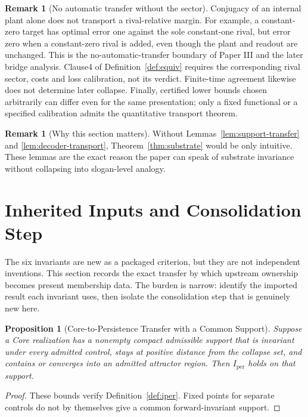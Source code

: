 \documentclass[11pt,a4paper]{article}
\newtheorem{proposition}[theorem]{Proposition}
\theoremstyle{definition}
\newtheorem{remark}[theorem]{Remark}
\newcommand{\Iper}{I_{\mathrm{per}}}
\begin{document}
\begin{remark}[No automatic transfer without the sector]\label{rem:sector-nontransfer}
Conjugacy of an internal plant alone does not transport a rival-relative margin. For example, a constant-zero target has optimal error one against the sole constant-one rival, but error zero when a constant-zero rival is added, even though the plant and readout are unchanged. This is the no-automatic-transfer boundary of Paper III and the later bridge analysis. Clause4 of Definition~\ref{def:equiv} requires the corresponding rival sector, costs and loss calibration, not its verdict. Finite-time agreement likewise does not determine later collapse. Finally, certified lower bounds chosen arbitrarily can differ even for the same presentation; only a fixed functional or a specified calibration admits the quantitative transport theorem.
\end{remark}

\begin{remark}[Why this section matters]
Without Lemmas~\ref{lem:support-transfer} and \ref{lem:decoder-transport}, Theorem~\ref{thm:substrate} would be only intuitive. These lemmas are the exact reason the paper can speak of substrate invariance without collapsing into slogan-level analogy.
\end{remark}

\section{Inherited Inputs and Consolidation Step}
The six invariants are new as a packaged criterion, but they are not independent inventions. This section records the exact transfer by which upstream ownership becomes present membership data. The burden is narrow: identify the imported result each invariant uses, then isolate the consolidation step that is genuinely new here.

\begin{proposition}[Core-to-Persistence Transfer with a Common Support]\label{prop:core-per}
Suppose a Core realization has a nonempty compact admissible support that is invariant under every admitted control, stays at positive distance from the collapse set, and contains or converges into an admitted attractor region. Then $\Iper$ holds on that support.
\end{proposition}

\begin{proof}
These bounds verify Definition~\ref{def:iper}. Fixed points for separate controls do not by themselves give a common forward-invariant support.
\end{proof}
\end{document}
